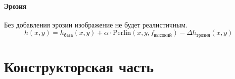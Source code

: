 
\subsubsection{Эрозия}
Без добавления эрозии изображение не будет реалистичным. 
\[
h(x, y) = h_{\text{база}}(x, y) + \alpha \cdot \text{Perlin}(x, y, f_{\text{высокий}}) - \Delta h_{\text{эрозия}}(x, y)
\]

\chapter{Конструкторская часть}




